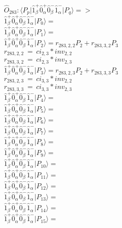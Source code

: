 \documentclass[14pt]{article}
\begin{document}
    $\hat{O}_{283}:  \langle{P_p}\vert \hat{1}_{\beta}^{+}\hat{0}_{\alpha}^{+}\hat{0}_{\beta}^{-}\hat{1}_{\alpha}^{-} \vert{P_q}\rangle => $ \\ 
    $ \hat{1}_{\beta}^{+}\hat{0}_{\alpha}^{+}\hat{0}_{\beta}^{-}\hat{1}_{\alpha}^{-} \vert{P_{0}}\rangle =  $ \\ 
    $ \hat{1}_{\beta}^{+}\hat{0}_{\alpha}^{+}\hat{0}_{\beta}^{-}\hat{1}_{\alpha}^{-} \vert{P_{1}}\rangle =  $ \\ 
    $ \hat{1}_{\beta}^{+}\hat{0}_{\alpha}^{+}\hat{0}_{\beta}^{-}\hat{1}_{\alpha}^{-} \vert{P_{2}}\rangle = {r}_{283,2,2}P_{2}+{r}_{283,3,2}P_{3} $ \\ 
    ${r}_{283,2,2}\ =\ {ci}_{2,3}*{inv}_{2,2} $ \\ 
    ${r}_{283,3,2}\ =\ {ci}_{2,3}*{inv}_{2,3} $ \\ 
    $ \hat{1}_{\beta}^{+}\hat{0}_{\alpha}^{+}\hat{0}_{\beta}^{-}\hat{1}_{\alpha}^{-} \vert{P_{3}}\rangle = {r}_{283,2,3}P_{2}+{r}_{283,3,3}P_{3} $ \\ 
    ${r}_{283,2,3}\ =\ {ci}_{3,3}*{inv}_{2,2} $ \\ 
    ${r}_{283,3,3}\ =\ {ci}_{3,3}*{inv}_{2,3} $ \\ 
    $ \hat{1}_{\beta}^{+}\hat{0}_{\alpha}^{+}\hat{0}_{\beta}^{-}\hat{1}_{\alpha}^{-} \vert{P_{4}}\rangle =  $ \\ 
    $ \hat{1}_{\beta}^{+}\hat{0}_{\alpha}^{+}\hat{0}_{\beta}^{-}\hat{1}_{\alpha}^{-} \vert{P_{5}}\rangle =  $ \\ 
    $ \hat{1}_{\beta}^{+}\hat{0}_{\alpha}^{+}\hat{0}_{\beta}^{-}\hat{1}_{\alpha}^{-} \vert{P_{6}}\rangle =  $ \\ 
    $ \hat{1}_{\beta}^{+}\hat{0}_{\alpha}^{+}\hat{0}_{\beta}^{-}\hat{1}_{\alpha}^{-} \vert{P_{7}}\rangle =  $ \\ 
    $ \hat{1}_{\beta}^{+}\hat{0}_{\alpha}^{+}\hat{0}_{\beta}^{-}\hat{1}_{\alpha}^{-} \vert{P_{8}}\rangle =  $ \\ 
    $ \hat{1}_{\beta}^{+}\hat{0}_{\alpha}^{+}\hat{0}_{\beta}^{-}\hat{1}_{\alpha}^{-} \vert{P_{9}}\rangle =  $ \\ 
    $ \hat{1}_{\beta}^{+}\hat{0}_{\alpha}^{+}\hat{0}_{\beta}^{-}\hat{1}_{\alpha}^{-} \vert{P_{10}}\rangle =  $ \\ 
    $ \hat{1}_{\beta}^{+}\hat{0}_{\alpha}^{+}\hat{0}_{\beta}^{-}\hat{1}_{\alpha}^{-} \vert{P_{11}}\rangle =  $ \\ 
    $ \hat{1}_{\beta}^{+}\hat{0}_{\alpha}^{+}\hat{0}_{\beta}^{-}\hat{1}_{\alpha}^{-} \vert{P_{12}}\rangle =  $ \\ 
    $ \hat{1}_{\beta}^{+}\hat{0}_{\alpha}^{+}\hat{0}_{\beta}^{-}\hat{1}_{\alpha}^{-} \vert{P_{13}}\rangle =  $ \\ 
    $ \hat{1}_{\beta}^{+}\hat{0}_{\alpha}^{+}\hat{0}_{\beta}^{-}\hat{1}_{\alpha}^{-} \vert{P_{14}}\rangle =  $ \\ 
    $ \hat{1}_{\beta}^{+}\hat{0}_{\alpha}^{+}\hat{0}_{\beta}^{-}\hat{1}_{\alpha}^{-} \vert{P_{15}}\rangle =  $ \\ 
    
\end{document}
